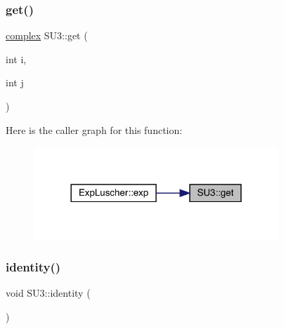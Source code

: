 \mbox{\label{class_s_u3_aa0c34df7c067dcbb917d18cf587046a2}} 
\subsubsection{\texorpdfstring{get()}{get()}}
{\footnotesize\ttfamily \mbox{\hyperlink{classcomplex}{complex}} S\+U3\+::get (\begin{DoxyParamCaption}\item[{int}]{i,  }\item[{int}]{j }\end{DoxyParamCaption})\hspace{0.3cm}{\ttfamily [inline]}}

Here is the caller graph for this function\+:\nopagebreak
\begin{figure}[H]
\begin{center}
\leavevmode
\includegraphics[width=261pt]{class_s_u3_aa0c34df7c067dcbb917d18cf587046a2_icgraph}
\end{center}
\end{figure}
\mbox{\label{class_s_u3_af84aef1d34a4fdcda292200804eb1221}} 
\subsubsection{\texorpdfstring{identity()}{identity()}}
{\footnotesize\ttfamily void S\+U3\+::identity (\begin{DoxyParamCaption}{ }\end{DoxyParamCaption})}

